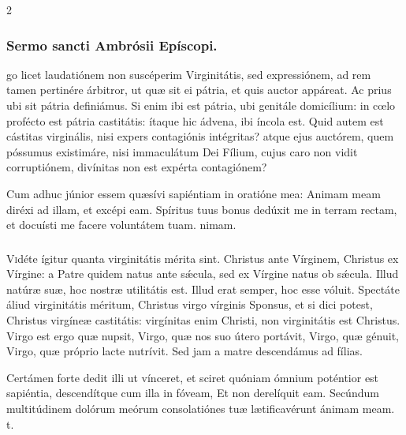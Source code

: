 \documentclass[9pt,twoside]{extarticle}
\begin{document}
\begin{multicols}{2}
\subsubsection*{\center Sermo sancti Ambrósii Epíscopi.}
\begin{center}\end{center}
go licet laudatiónem non suscéperim Virginitátis, sed expressiónem, ad rem tamen pertinére árbitror, ut quæ sit ei pátria, et quis auctor appáreat. Ac prius ubi sit pátria definiámus. Si enim ibi est pátria, ubi genitále domicílium: in cœlo profécto est pátria castitátis: ítaque hic ádvena, ibi íncola est. Quid autem est cástitas virginális, nisi expers contagiónis intégritas? atque ejus auctórem, quem póssumus existimáre, nisi immaculátum Dei Fílium, cujus caro non vidit corruptiónem, divínitas non est expérta contagiónem?

\begin{tightlist}{}
\item {} Cum adhuc júnior essem quæsívi sapiéntiam in oratióne mea: \textred{*} Animam meam diréxi ad illam, et excépi eam.  Spíritus tuus bonus dedúxit me in terram rectam, et docuísti me facere voluntátem tuam. nimam.
\end{tightlist}

\subsubsection*{\center {}}
\lettrine{V}idéte ígitur quanta virginitátis mérita sint. Christus ante Vírginem, Christus ex Vírgine: a Patre quidem natus ante sǽcula, sed ex Vírgine natus ob sǽcula. Illud natúræ suæ, hoc nostræ utilitátis est. Illud erat semper, hoc esse vóluit. Spectáte áliud virginitátis méritum, Christus virgo vírginis Sponsus, et si dici potest, Christus virgíneæ castitátis: virgínitas enim Christi, non virginitátis est Christus. Virgo est ergo quæ nupsit, Virgo, quæ nos suo útero portávit, Virgo, quæ génuit, Virgo, quæ próprio lacte nutrívit. Sed jam a matre descendámus ad fílias.

\begin{tightlist}{}
\item {} Certámen forte dedit illi ut vínceret, et sciret quóniam ómnium poténtior est sapiéntia, descendítque cum illa in fóveam, \textred{*} Et non derelíquit eam.  Secúndum multitúdinem dolórum meórum consolatiónes tuæ lætificavérunt ánimam meam. t.
\end{tightlist}


\end{multicols}
\end{document}
